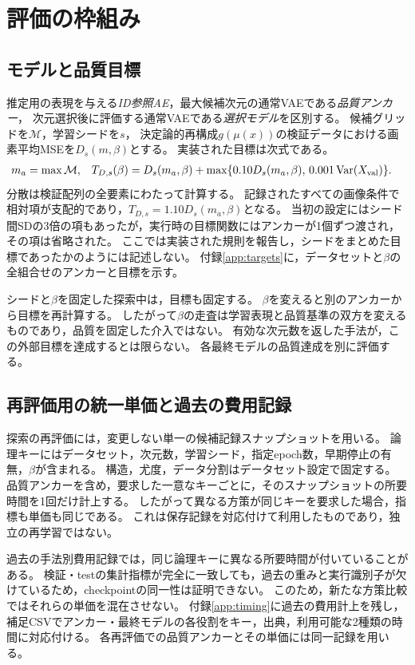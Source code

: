 \documentclass[11pt,a4paper]{ltjsarticle}
\begin{document}
\section{評価の枠組み}\label{sec:framework}

\subsection{モデルと品質目標}\label{sec:quality}
推定用の表現を与える\emph{ID参照AE}，最大候補次元の通常VAEである\emph{品質アンカー}，
次元選択後に評価する通常VAEである\emph{選択モデル}を区別する。
候補グリッドを$\mathcal M$，学習シードを$s$，
決定論的再構成$g(\mu(x))$の検証データにおける画素平均MSEを$D_s(m,\beta)$とする。
実装された目標は次式である。
\begin{align}
 m_a&=\max\mathcal M, &
 T_{D,s}(\beta)&=D_s(m_a,\beta)
 +\max\{0.10D_s(m_a,\beta),\,0.001\operatorname{Var}(X_{\rm val})\}.
 \label{eq:target}
\end{align}
分散は検証配列の全要素にわたって計算する。
記録されたすべての画像条件で相対項が支配的であり，$T_{D,s}=1.10D_s(m_a,\beta)$となる。
当初の設定にはシード間SDの3倍の項もあったが，実行時の目標関数にはアンカーが1個ずつ渡され，その項は省略された。
ここでは実装された規則を報告し，シードをまとめた目標であったかのようには記述しない。
付録\ref{app:targets}に，データセットと$\beta$の全組合せのアンカーと目標を示す。

シードと$\beta$を固定した探索中は，目標も固定する。
$\beta$を変えると別のアンカーから目標を再計算する。
したがって$\beta$の走査は学習表現と品質基準の双方を変えるものであり，品質を固定した介入ではない。
有効な次元数を返した手法が，この外部目標を達成するとは限らない。
各最終モデルの品質達成を別に評価する。

\subsection{再評価用の統一単価と過去の費用記録}\label{sec:cost}
探索の再評価には，変更しない単一の候補記録スナップショットを用いる。
論理キーにはデータセット，次元数，学習シード，指定epoch数，早期停止の有無，$\beta$が含まれる。
構造，尤度，データ分割はデータセット設定で固定する。
品質アンカーを含め，要求した一意なキーごとに，そのスナップショットの所要時間を1回だけ計上する。
したがって異なる方策が同じキーを要求した場合，指標も単価も同じである。
これは保存記録を対応付けて利用したものであり，独立の再学習ではない。

過去の手法別費用記録では，同じ論理キーに異なる所要時間が付いていることがある。
検証・testの集計指標が完全に一致しても，過去の重みと実行識別子が欠けているため，checkpointの同一性は証明できない。
このため，新たな方策比較ではそれらの単価を混在させない。
付録\ref{app:timing}に過去の費用計上を残し，補足CSVでアンカー・最終モデルの各役割をキー，出典，利用可能な2種類の時間に対応付ける。
各再評価での品質アンカーとその単価には同一記録を用いる。
\end{document}
